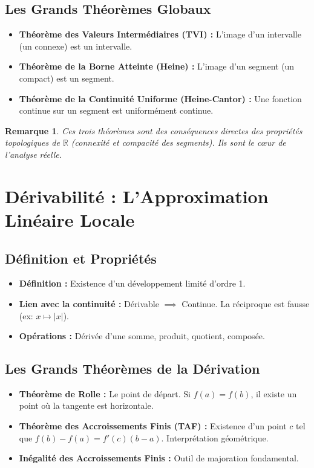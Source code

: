 \documentclass[12pt, a4paper, parskip=full]{report}
\theoremstyle{agregstyle}
\newtheorem{remark}[definition]{Remarque}
\begin{document}
\subsection{Les Grands Théorèmes Globaux}
\begin{itemize}
    \item \textbf{Théorème des Valeurs Intermédiaires (TVI) :} L'image d'un intervalle (un connexe) est un intervalle.
    \item \textbf{Théorème de la Borne Atteinte (Heine) :} L'image d'un segment (un compact) est un segment.
    \item \textbf{Théorème de la Continuité Uniforme (Heine-Cantor) :} Une fonction continue sur un segment est uniformément continue.
\end{itemize}
\begin{remark}
    Ces trois théorèmes sont des conséquences directes des propriétés topologiques de $\mathbb{R}$ (connexité et compacité des segments). Ils sont le cœur de l'analyse réelle.
\end{remark}

\section{Dérivabilité : L'Approximation Linéaire Locale}
\subsection{Définition et Propriétés}
\begin{itemize}
    \item \textbf{Définition :} Existence d'un développement limité d'ordre 1.
    \item \textbf{Lien avec la continuité :} Dérivable $\implies$ Continue. La réciproque est fausse (ex: $x \mapsto |x|$).
    \item \textbf{Opérations :} Dérivée d'une somme, produit, quotient, composée.
\end{itemize}
\subsection{Les Grands Théorèmes de la Dérivation}
\begin{itemize}
    \item \textbf{Théorème de Rolle :} Le point de départ. Si $f(a)=f(b)$, il existe un point où la tangente est horizontale.
    \item \textbf{Théorème des Accroissements Finis (TAF) :} Existence d'un point $c$ tel que $f(b)-f(a) = f'(c)(b-a)$. Interprétation géométrique.
    \item \textbf{Inégalité des Accroissements Finis :} Outil de majoration fondamental.
\end{itemize}
\end{document}
